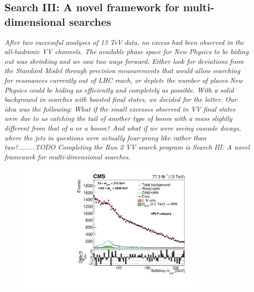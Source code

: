\vspace*{\fill}

\clearpage

\clearpage

\vspace*{\fill}
\begin{centering}
\section{Search III: A novel framework for multi-dimensional searches}
\label{searchIII}
\textit{
After two successful analyses of 13 TeV data, no excess had been observed in the all-hadronic VV channels. The available phase space for New Physics to be hiding out was shrinking and we saw two ways forward: Either look for deviations from the Standard Model through precision measurements that would allow searching for resonances currently out of LHC reach, or deplete the number of places New Physics could be hiding as efficiently and completely as possible.
With a solid background in searches with boosted final states, we decided for the latter. Our idea was the following: What if the small excesses observed in VV final states were due to us catching the tail of another type of boson with a mass slightly different from that of a \PW or a \PZ boson? And what if we were seeing cascade decays, where the jets in questions were actually four-prong like rather than two?........TODO
\newline
\newline
Completing the Run 2 VV search program is Search III: A novel framework for multi-dimensional searches.
}
\end{centering}
\begin{figure}[b!]
    \centering
    \includegraphics[height=6.5cm]{figures/analysis/search3/B2G-18-002/PostFitComboHPLP_Y-Proj__x___0_-1_z___0_-1.pdf}
\end{figure}

\vspace*{\fill}

\clearpage




